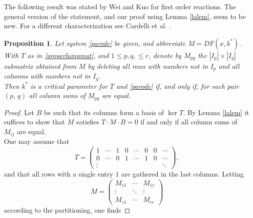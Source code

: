 \documentclass{article}
\newtheorem{proposition}{Proposition}
\begin{document}
The following result was stated by Wei and Kuo for first order reactions. The general  version of the statement, and our proof using Lemma \ref{lalem}, seem to be new. For a different characterization see Cardelli et al. \cite{CardelliTTV2017}.
\begin{proposition}\label{colslem} Let system \eqref{parode} be given, and abbreviate $M=DF(x,k^*)$. With $T$ as in \eqref{properlumpmat}, and $1\leq p,q,\leq r$, denote by  $M_{pq}$  the $|I_p|\times |I_q|$ submatrix obtained from $M$ by deleting all rows with numbers not in $I_p$ and all columns with numbers not in $I_q$. \\
Then  $k^*$ is a critical parameter for $T$ and \eqref{parode} if, and only if, for each pair $(p,\, q)$ all column sums of $M_{pq}$ are equal.
\end{proposition}
\begin{proof} 
Let $B$ be such that its columns form a basis of $\ker T$. By Lemma \ref{lalem} it suffices to show that $M$ satisfies $T\cdot M\cdot B=0$ if and only if  all column sums of $M_{ij}$ are equal.\\
One may assume that 
\[
T=\begin{pmatrix} 1&\cdots&1&0&\cdots& 0& 0&\cdots\\
0&\cdots &0&1&\cdots&1&0&\cdots\\
\vdots&&&&&&&\ddots
\end{pmatrix},
\]
and that all rows with a single entry $1$ are gathered in the last columns. Letting
\[
M=\begin{pmatrix} M_{11}&\cdots&M_{1r}\\
          \vdots & \ddots&\vdots \\
               M_{r1}&\cdots & M_{rr}\end{pmatrix}
\]
according to the partitioning, one finds


\end{proof}
\end{document}
